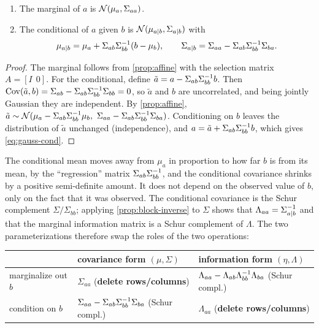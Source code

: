 \begin{theorem}
\label{thm:gauss-cond}
\begin{enumerate}
  \item The marginal of $a$ is $\mathcal{N}(\mu_a, \Sigma_{aa})$.
  \item The conditional of $a$ given $b$ is $\mathcal{N}(\mu_{a|b}, \Sigma_{a|b})$ with
  \begin{equation}
    \mu_{a|b} = \mu_a + \Sigma_{ab}\Sigma_{bb}^{-1} (b - \mu_b), \qquad
    \Sigma_{a|b} = \Sigma_{aa} - \Sigma_{ab}\Sigma_{bb}^{-1}\Sigma_{ba}.
    \label{eq:gauss-cond}
  \end{equation}
\end{enumerate}
\end{theorem}
\begin{proof}
The marginal follows from \cref{prop:affine} with the selection matrix $A = [I\ \ 0]$. For the conditional, define
$\tilde a = a - \Sigma_{ab}\Sigma_{bb}^{-1} b$. Then $\operatorname{Cov}(\tilde a, b) = \Sigma_{ab} - \Sigma_{ab}\Sigma_{bb}^{-1}\Sigma_{bb} = 0$, so $\tilde a$ and $b$ are uncorrelated,
and being jointly Gaussian they are independent. By \cref{prop:affine},
$\tilde a \sim \mathcal{N}(\mu_a - \Sigma_{ab}\Sigma_{bb}^{-1}\mu_b,\ \Sigma_{aa} - \Sigma_{ab}\Sigma_{bb}^{-1}\Sigma_{ba})$. Conditioning on $b$ leaves the distribution of
$\tilde a$ unchanged (independence), and $a = \tilde a + \Sigma_{ab}\Sigma_{bb}^{-1} b$, which gives \eqref{eq:gauss-cond}.
\end{proof}

The conditional mean moves away from $\mu_a$ in proportion to how far $b$ is from its mean, by the ``regression'' matrix $\Sigma_{ab}\Sigma_{bb}^{-1}$,
and the conditional covariance shrinks by a positive semi-definite amount. It does not depend on the observed value of $b$, only on the
fact that it was observed. The conditional covariance is the Schur complement $\Sigma/\Sigma_{bb}$; applying \cref{prop:block-inverse} to $\Sigma$
shows that $\Lambda_{aa} = \Sigma_{a|b}^{-1}$ and that the marginal information matrix is a Schur complement of $\Lambda$. The two parameterizations
therefore swap the roles of the two operations:

\begin{center}\small
\begin{tabular}{@{}lll@{}}
\toprule
 & covariance form $(\mu, \Sigma)$ & information form $(\eta, \Lambda)$ \\
\midrule
marginalize out $b$ & $\Sigma_{aa}$ \hfill(\textbf{delete rows/columns}) & $\Lambda_{aa} - \Lambda_{ab}\Lambda_{bb}^{-1}\Lambda_{ba}$ \hfill(Schur compl.) \\
condition on $b$ & $\Sigma_{aa} - \Sigma_{ab}\Sigma_{bb}^{-1}\Sigma_{ba}$ \hfill(Schur compl.) & $\Lambda_{aa}$ \hfill(\textbf{delete rows/columns}) \\
\bottomrule
\end{tabular}
\end{center}

